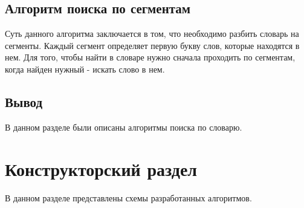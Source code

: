 \documentclass[14pt, a4paper]{extarticle}
\begin{document}
\subsection{Алгоритм поиска по сегментам}
Суть данного алгоритма заключается в том, что необходимо разбить словарь на сегменты. Каждый сегмент определяет первую букву слов, которые находятся в нем. Для того, чтобы найти в словаре нужно сначала проходить по сегментам, когда найден нужный - искать слово в нем.
\subsection{Вывод}
В данном разделе были описаны алгоритмы поиска по словарю.
\clearpage
\section{Конструкторский раздел}
В данном разделе представлены схемы разработанных алгоритмов.
\end{document}
